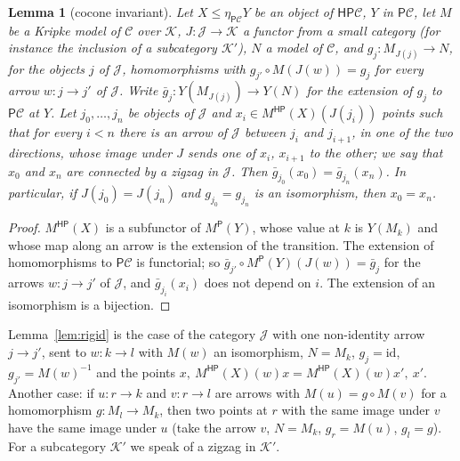 \documentclass[11pt]{amsart}
\newtheorem{lem}[thm]{Lemma}
\theoremstyle{definition}
\newcommand{\PP}{\mathsf P}
\newcommand{\HH}{\mathsf H}
\newcommand{\cC}{\mathcal C}
\newcommand{\cK}{\mathcal K}
\begin{document}
\begin{lem}[cocone invariant]\label{lem:factor}
Let $X\le\eta_{\PP\cC}Y$ be an object of $\HH\PP\cC$, $Y$ in $\PP\cC$,
let $M$ be a Kripke model of $\cC$ over $\cK$, $J\colon\mathcal J\to
\cK$ a functor from a small category (for instance the inclusion of a
subcategory $\cK'$), $N$ a model of $\cC$, and $g_j\colon M_{J(j)}\to
N$, for the objects $j$ of $\mathcal J$, homomorphisms with $g_{j'}
\circ M(J(w))=g_j$ for every arrow $w\colon j\to j'$ of $\mathcal J$.
Write $\bar g_j\colon Y(M_{J(j)})\to Y(N)$ for the extension of $g_j$
to $\PP\cC$ at $Y$. Let $j_0,\dots,j_n$ be objects of $\mathcal J$ and
$x_i\in M^{\HH\PP}(X)(J(j_i))$ points such that for every $i<n$ there
is an arrow of $\mathcal J$ between $j_i$ and $j_{i+1}$, in one of the
two directions, whose image under $J$ sends one of $x_i$, $x_{i+1}$ to
the other; we say that $x_0$ and $x_n$ are \emph{connected by a zigzag
in $\mathcal J$}. Then $\bar g_{j_0}(x_0)=\bar g_{j_n}(x_n)$. In
particular, if $J(j_0)=J(j_n)$ and $g_{j_0}=g_{j_n}$ is an
isomorphism, then $x_0=x_n$.
\end{lem}
\begin{proof}
$M^{\HH\PP}(X)$ is a subfunctor of $M^{\PP}(Y)$, whose value at $k$ is
$Y(M_k)$ and whose map along an arrow is the extension of the
transition. The extension of homomorphisms to $\PP\cC$ is functorial;
so $\bar g_{j'}\circ M^{\PP}(Y)(J(w))=\bar g_j$ for the arrows
$w\colon j\to j'$ of $\mathcal J$, and $\bar g_{j_i}(x_i)$ does not
depend on $i$. The extension of an isomorphism is a bijection.
\end{proof}

Lemma~\ref{lem:rigid} is the case of the category $\mathcal J$ with one
non-identity arrow $j\to j'$, sent to $w\colon k\to l$ with $M(w)$ an
isomorphism, $N=M_k$, $g_j=\mathrm{id}$, $g_{j'}=M(w)^{-1}$ and the
points $x,\ M^{\HH\PP}(X)(w)x=M^{\HH\PP}(X)(w)x',\ x'$. Another case: if
$u\colon r\to k$ and $v\colon r\to l$ are arrows with $M(u)=g\circ
M(v)$ for a homomorphism $g\colon M_l\to M_k$, then two points at $r$
with the same image under $v$ have the same image under $u$ (take the
arrow $v$, $N=M_k$, $g_r=M(u)$, $g_l=g$). For a subcategory $\cK'$ we
speak of a zigzag in $\cK'$.
\end{document}
